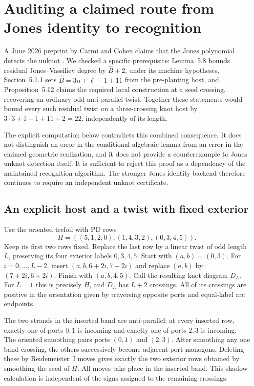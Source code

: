 \section{Auditing a claimed route from Jones identity to recognition}
\label{sec:jones-detection-audit}

A June 2026 preprint by Carmi and Cohen claims that the Jones polynomial
detects the unknot \cite{carmi-cohen2026}.  We checked a specific prerequisite:
Lemma~5.8 bounds residual Jones--Vassiliev degree by
$\widehat B+2$, under its machine hypotheses.  Section~5.1.1 sets
$\widehat B=3n+\ell-1+11$ from the pre-planting host, and
Proposition~5.12 claims the required local construction at a seed crossing,
recovering an ordinary odd anti-parallel twist.  Together these statements
would bound every such residual twist on a three-crossing knot host by
$3\cdot3+1-1+11+2=22$, independently of its length.

The explicit computation below contradicts this combined consequence.
It does not distinguish an error in the conditional algebraic lemma from
an error in the claimed geometric realization, and it does not provide
a counterexample to Jones unknot detection itself.  It is sufficient to
reject this proof as a dependency of the maintained recognition algorithm.
The stronger Jones identity backend therefore continues to require an
independent unknot certificate.

\subsection{An explicit host and a twist with fixed exterior}

Use the oriented trefoil with PD rows
\[
 H=((5,1,2,0),(1,4,3,2),(0,3,4,5)).
\]
Keep its first two rows fixed.  Replace the last row by a linear twist
of odd length $L$, preserving its four exterior labels $0,3,4,5$.
Start with $(a,b)=(0,3)$.  For $i=0,\ldots,L-2$, insert
$(a,b,6+2i,7+2i)$ and replace $(a,b)$ by $(7+2i,6+2i)$.
Finish with $(a,b,4,5)$.  Call the resulting knot diagram $D_L$.
For $L=1$ this is precisely $H$, and $D_L$ has $L+2$ crossings.
All of its crossings are positive in the orientation given by traversing
opposite ports and equal-label arc endpoints.

The two strands in the inserted band are anti-parallel: at every inserted
row, exactly one of ports $0,1$ is incoming and exactly one of ports $2,3$
is incoming.  The oriented smoothing pairs ports $(0,1)$ and $(2,3)$.
After smoothing any one band crossing, the others successively become
adjacent-port monogons.  Deleting these by Reidemeister~I moves gives
exactly the two exterior rows obtained by smoothing the seed of $H$.
All moves take place in the inserted band.  This shadow calculation is
independent of the signs assigned to the remaining crossings.

